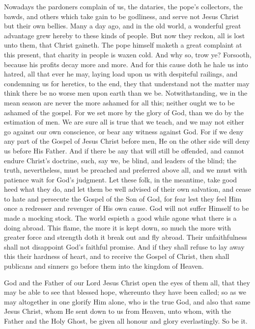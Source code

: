 Nowadays the pardoners complain of us, the dataries, the pope’s
collectors, the bawds, and others which take gain to be godliness, and
serve not Jesus Christ but their own bellies. Many a day ago,
and in the old world, a wonderful great advantage grew hereby to these
kinds of people. But now they reckon, all is lost unto them, that
Christ gaineth. The pope himself maketh a great complaint at this
present, that charity in people is waxen cold. And why so, trow
ye? Forsooth, because his profits decay more and more. And
for this cause doth he hale us into hatred, all that ever he may, laying
load upon us with despiteful railings, and condemning us for heretics,
to the end, they that understand not the matter may think there be no
worse men upon earth than we be. Notwithstanding, we in the mean
season are never the more
ashamed for all this; neither ought we to be ashamed of the gospel.
For we set more by the glory of God, than we do by the estimation of
men. We are sure all is true that we teach, and we may not either
go against our own conscience, or bear any witness against God.
For if we deny any part of the Gospel of Jesus Christ before men, He
on the other side will deny us before His Father. And if there
be any that will still be offended, and cannot endure Christ’s
doctrine, such, say we, be blind, and leaders of the blind; the truth,
nevertheless, must be preached and preferred above all, and we must
with patience wait for God’s judgment. Let these folk, in
the meantime, take good heed what they do, and let them be well advised
of their own salvation, and cease to hate and persecute the Gospel of
the Son of God, for fear lest they feel Him once a redresser and revenger
of His own cause. God will not suffer Himself to be made a mocking
stock. The world espieth a good while agone what there is a doing
abroad. This flame, the more it is kept down, so much the more
with greater force and strength doth it break out and fly abroad.
Their unfaithfulness shall not disappoint God’s faithful promise.
And if they shall refuse to lay away this their
hardness of heart, and to receive the Gospel of Christ, then shall publicans
and sinners go before them into the kingdom of Heaven.

God and the Father of our Lord Jesus Christ open the eyes of them
all, that they may be able to see that blessed hope, whereunto they
have been called; so as we may altogether in one glorify Him alone,
who is the true God, and also that same Jesus Christ, whom He sent down
to us from Heaven, unto whom, with the Father and the Holy Ghost, be
given all honour and glory everlastingly. So be it.
